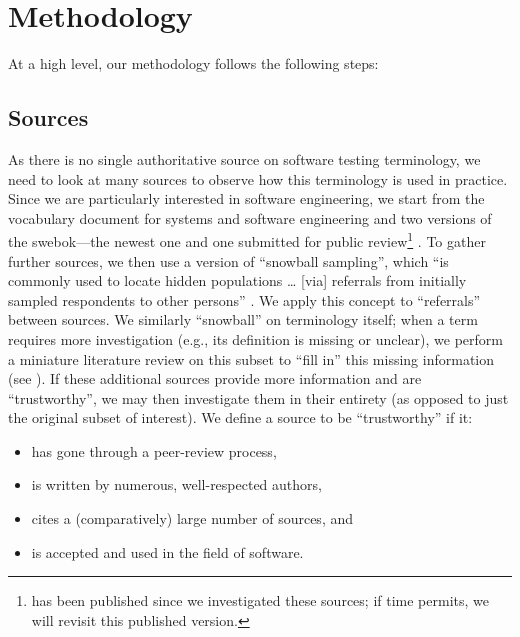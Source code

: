 \section{Methodology}
\label{methodology}

At a high level, our methodology follows the following steps:



\subsection{Sources}
\label{sources}
As there is no single authoritative source on software testing terminology,
we need to look at many sources to observe how this terminology is used in
practice. Since we are particularly interested in software engineering, we
start from the vocabulary document for systems and software engineering%
\citep{IEEE2017} and two versions of the \acf{swebok}---the newest
one \citep{SWEBOK2014} and one submitted for public review\footnote{
     \citep{SWEBOK2024} has been published since we investigated
    these sources; if time permits, we will revisit this published version.
} \citep{SWEBOK2024}. To gather further sources, we then use a version of
``snowball sampling'',
which ``is commonly used to locate hidden populations \dots{} [via] referrals
from initially sampled respondents to other persons'' \citep{Johnson2014}. We
apply this concept to ``referrals'' between sources. \addTextEx{} We similarly
``snowball'' on terminology itself; when a term requires more investigation
(e.g., its definition is missing or unclear), we perform a
miniature literature review on this subset to ``fill in'' this missing
information (see ). If these additional sources provide more
information and are ``trustworthy'', we may then investigate them in their
entirety (as opposed to just the original subset of interest). We define a
source to be ``trustworthy'' if it:
\begin{itemize}
    \item has gone through a peer-review process,
    \item is written by numerous, well-respected authors,
    \item cites a (comparatively) large number of sources, and
    \item is accepted and used in the field of software.
\end{itemize}

